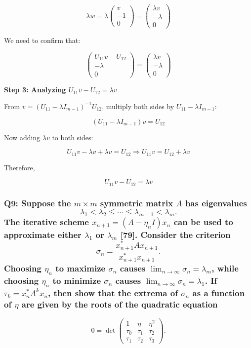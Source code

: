 \documentclass[8pt]{article}
\begin{document}
\[
\lambda w = \lambda \begin{pmatrix}
v \\
-1 \\
0
\end{pmatrix} = \begin{pmatrix}
\lambda v \\
-\lambda \\
0
\end{pmatrix}
\]

We need to confirm that:

\[
\begin{pmatrix}
U_{11}v - U_{12} \\
-\lambda \\
0
\end{pmatrix} = \begin{pmatrix}
\lambda v \\
-\lambda \\
0
\end{pmatrix}
\]

\textbf{Step 3: Analyzing \(U_{11}v - U_{12} = \lambda v\)}

From \(v = (U_{11} - \lambda I_{m-1})^{-1} U_{12}\), multiply both sides by \(U_{11} - \lambda I_{m-1}\):

\[
(U_{11} - \lambda I_{m-1})v = U_{12}
\]

Now adding \(\lambda v\) to both sides:

\[
U_{11}v - \lambda v + \lambda v = U_{12} \Rightarrow U_{11}v = U_{12} + \lambda v
\]

Therefore,

\[
U_{11}v - U_{12} = \lambda v
\]


\subsubsection*{Q9: Suppose the \(m \times m\) symmetric matrix \(A\) has eigenvalues
\[
\lambda_1 < \lambda_2 \le \cdots \le \lambda_{m-1} < \lambda_m.
\]
The iterative scheme \(x_{n+1} = (A - \eta_n I)x_n\) can be used to approximate either \(\lambda_1\) or \(\lambda_m\) [79]. Consider the criterion
\[
\sigma_n = \frac{x_{n+1}^* A x_{n+1}}{x_{n+1}^* x_{n+1}}.
\]
Choosing \(\eta_n\) to maximize \(\sigma_n\) causes \(\lim_{n \to \infty} \sigma_n = \lambda_m\), while choosing \(\eta_n\) to minimize \(\sigma_n\) causes \(\lim_{n \to \infty} \sigma_n = \lambda_1\). If \(\tau_k = x_n^* A^k x_n\), then show that the extrema of \(\sigma_n\) as a function of \(\eta\) are given by the roots of the quadratic equation}
\[
0 = \det \begin{pmatrix}
1 & \eta & \eta^2 \\
\tau_0 & \tau_1 & \tau_2 \\
\tau_1 & \tau_2 & \tau_3
\end{pmatrix}.
\]
\end{document}
